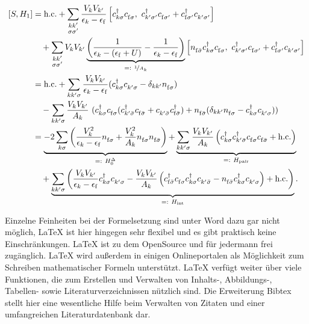 \begin{align}
	\left[ S,  H_1 \right] &= \text{h.c.} + \sum_{\substack{k k'\\\sigma \sigma'}} \frac{V_k V_{k'}}{\epsilon_k - \epsilon_\mathrm{f}} \left[ \cre_{k \sigma} \anh_{\mathrm{f} \sigma},~ \cre_{k' \sigma'} \anh_{\mathrm{f} \sigma'} + \cre_{\mathrm{f} \sigma'} \anh_{k' \sigma'} \right] \\\nonumber
	&\quad+ \sum_{\substack{k k'\\\sigma \sigma'}} V_k V_{k'} \underbrace{\left( \frac{1}{\epsilon_k - (\epsilon_\mathrm{f} + U)} - \frac{1}{\epsilon_k - \epsilon_\mathrm{f}} \right)}_{=:~\nicefrac{1}{A_k}} \left[ \numb_{\mathrm{f} \bar \sigma} \cre_{k \sigma} \anh_{\mathrm{f} \sigma},~ \cre_{k' \sigma'} \anh_{\mathrm{f} \sigma'} + \cre_{\mathrm{f} \sigma'} \anh_{k' \sigma'} \right]\\
	&= \text{h.c.} + \sum_{k k' \sigma} \frac{V_k V_{k'}}{\epsilon_k - \epsilon_\mathrm{f}} (\cre_{k \sigma} \anh_{k' \sigma} - \delta_{k k'} \numb_{\mathrm{f} \sigma}) \\\nonumber
	&\quad- \sum_{k k' \sigma} \frac{V_k V_{k'}}{A_k} ~ ( \cre_{k \sigma} \anh_{\mathrm{f} \sigma} (\cre_{k' \bar\sigma} \anh_{\mathrm{f} \bar \sigma} + \anh_{k' \bar\sigma} \cre_{\mathrm{f} \bar\sigma}) + \numb_{\mathrm{f} \bar\sigma} (\delta_{k k'} \numb_{\mathrm{f} \sigma} - \cre_{k \sigma} \anh_{k' \sigma} ))\\
	&= \underbrace{-2\sum_{k \sigma} \left( \frac{V_k^2}{\epsilon_k - \epsilon_\mathrm{f}} \numb_{\mathrm{f} \sigma} + \frac{V_k^2}{A_k} \numb_{\mathrm{f} \sigma} \numb_{\mathrm{f} \bar\sigma} \right)}_{=:~ H_0^\Delta}+ \underbrace{\sum_{k k' \sigma} \frac{V_k V_{k'}}{A_k} \left(\cre_{k \sigma} \cre_{k' \bar\sigma} \anh_{\mathrm{f} \sigma} \anh_{\mathrm{f} \bar\sigma} + \text{h.c.} \right)}_{=:~H_\text{pair}}\\\nonumber
	&\quad+\underbrace{\sum_{k k' \sigma} \left( \frac{V_k V_{k'}}{\epsilon_k - \epsilon_\mathrm{f}} \cre_{k \sigma} \anh_{k' \sigma} - \frac{V_k V_{k'}}{A_k} \left(\cre_{\mathrm{f} \bar \sigma} \anh_{\mathrm{f} \sigma} \cre_{k \sigma} \anh_{k' \bar\sigma} - \numb_{\mathrm{f} \bar \sigma} \cre_{k \sigma} \anh_{k' \sigma} \right) + \text{h.c.} \right)}_{=:~H_\text{int}}.
\end{align}

Einzelne Feinheiten bei der Formelsetzung sind unter Word dazu gar nicht möglich, LaTeX ist hier hingegen sehr flexibel und es gibt praktisch keine Einschränkungen. LaTeX ist zu dem OpenSource und für jedermann frei zugänglich. LaTeX wird außerdem in einigen Onlineportalen als Möglichkeit zum Schreiben mathematischer Formeln unterstützt. LaTeX verfügt weiter über viele Funktionen, die zum Erstellen und Verwalten von Inhalts-, Abbildungs-, Tabellen- sowie Literaturverzeichnissen nützlich sind. Die Erweiterung Bibtex stellt hier eine wesentliche Hilfe beim Verwalten von Zitaten und einer umfangreichen Literaturdatenbank dar.

